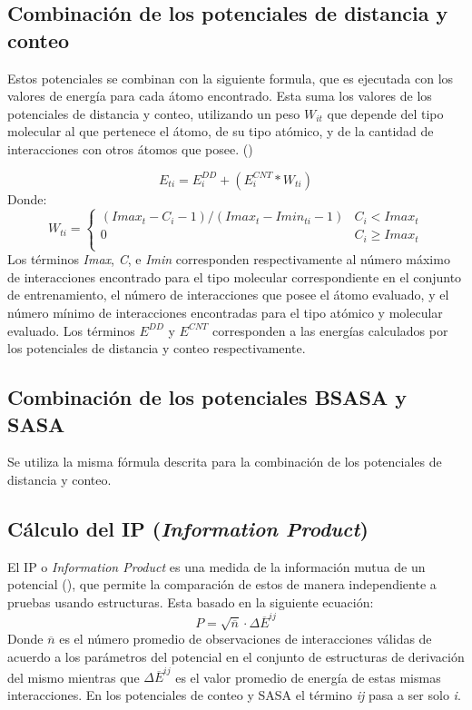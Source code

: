\subsection{Combinación de los potenciales de distancia y conteo}
\par
Estos potenciales se combinan con la siguiente formula, que es ejecutada con los valores de energía para cada átomo encontrado. 
Esta suma los valores de los potenciales de distancia y conteo, utilizando un peso \textit{$W_{it}$} que depende del tipo molecular al que pertenece el átomo, de su tipo atómico, y de la cantidad de interacciones con otros átomos que posee. (\cite{Melo1997})

\begin{equation}
E_{ti} = E^{DD}_{i} + (E^{CNT}_{i} * W_{ti})
\end{equation}
Donde:
\[W_{ti} = \left\{
\begin{array}{ll}
(Imax_{t} - C_{i} - 1)/(Imax_{t} - Imin_{ti} - 1) & C_{i} < Imax_{t} \\
0 & C_{i} \geq Imax_{t} \\
\end{array}
\right. \]
Los términos \textit{Imax}, \textit{C}, e \textit{Imin} corresponden respectivamente al número máximo de interacciones encontrado para el tipo molecular correspondiente en el conjunto de entrenamiento, el número de interacciones que posee el átomo evaluado, y el número mínimo de interacciones encontradas para el tipo atómico y molecular evaluado.
Los términos $E^{DD}$ y $E^{CNT}$ corresponden a las energías calculados por los potenciales de distancia y conteo respectivamente.

\subsection{Combinación de los potenciales BSASA y SASA}

Se utiliza la misma fórmula descrita para la combinación de los potenciales de distancia y conteo.

\subsection{Cálculo del IP (\textit{Information Product})}
\par
El IP o \textit{Information Product} es una medida de la información mutua de un potencial (\cite{Solis2008}), que permite la comparación de estos de manera independiente a pruebas usando estructuras.
Esta basado en la siguiente ecuación:
\begin{equation}
P = \sqrt{\overline{n}}\cdot\Delta\overline{E}^{ij} \label{ec:ip}
\end{equation}
Donde $ \overline{n} $ es el número promedio de observaciones de interacciones válidas de acuerdo a los parámetros del potencial en el conjunto de estructuras de derivación del mismo mientras que $ \Delta\overline{E}^{ij} $ es el valor promedio de energía de estas mismas interacciones. En los potenciales de conteo y SASA el término \textit{ij} pasa a ser solo \textit{i}.

